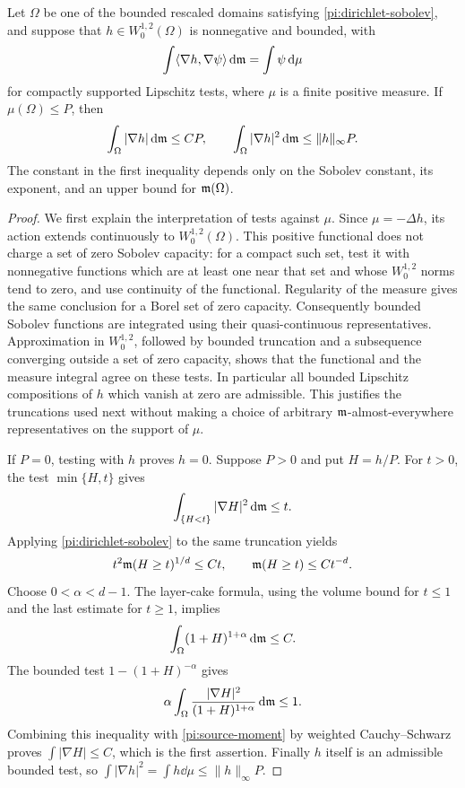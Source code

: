 \begin{lemma}
\label{pi:positive-source}
Let $\Omega$ be one of the bounded rescaled domains satisfying
\eqref{pi:dirichlet-sobolev}, and suppose that $h\in W^{1,2}_0(\Omega)$
is nonnegative and bounded, with
\[
 \int\langle\nabla h,\nabla\psi\rangle\,\mathrm d\mathfrak m
 =\int\psi\,\mathrm d\mu
\]
for compactly supported Lipschitz tests, where $\mu$ is a finite
positive measure.  If $\mu(\Omega)\le P$, then
\begin{equation}
 \int_\Omega|\nabla h|\,\mathrm d\mathfrak m\le CP,
 \qquad
 \int_\Omega|\nabla h|^2\,\mathrm d\mathfrak m\le\|h\|_\infty P.
 \label{pi:positive-source-bounds}
\end{equation}
The constant in the first inequality depends only on the Sobolev
constant, its exponent, and an upper bound for $\mathfrak m(\Omega)$.
\end{lemma}

\begin{proof}
We first explain the interpretation of tests against $\mu$.  Since
$\mu=-\Delta h$, its action extends continuously to
$W^{1,2}_0(\Omega)$.  This positive functional does not charge a set
of zero Sobolev capacity: for a compact such set, test it with
nonnegative functions which are at least one near that set and whose
$W^{1,2}_0$ norms tend to zero, and use continuity of the functional.
Regularity of the measure gives the same conclusion for a Borel set
of zero capacity.  Consequently bounded Sobolev functions are
integrated using their quasi-continuous representatives.  Approximation
in $W^{1,2}_0$, followed by bounded truncation and a subsequence
converging outside a set of zero capacity, shows that the functional
and the measure integral agree on these tests.  In particular all
bounded Lipschitz compositions of $h$ which vanish at zero are
admissible.  This justifies the truncations used next without making
a choice of arbitrary $\mathfrak m$-almost-everywhere representatives on the
support of $\mu$.

If $P=0$, testing with $h$ proves $h=0$.  Suppose $P>0$ and put
$H=h/P$.  For $t>0$, the test $\min\{H,t\}$ gives
\[
 \int_{\{H<t\}}|\nabla H|^2\,\mathrm d\mathfrak m\le t.
\]
Applying \eqref{pi:dirichlet-sobolev} to the same truncation yields
\[
 t^2\mathfrak m(H\ge t)^{1/d}\le Ct,
 \qquad \mathfrak m(H\ge t)\le Ct^{-d}.
\]
Choose $0<\alpha<d-1$.  The layer-cake formula, using the volume
bound for $t\le1$ and the last estimate for $t\ge1$, implies
\begin{equation}
 \int_\Omega(1+H)^{1+\alpha}\,\mathrm d\mathfrak m\le C.
 \label{pi:source-moment}
\end{equation}
The bounded test $1-(1+H)^{-\alpha}$ gives
\[
 \alpha\int_\Omega
 \frac{|\nabla H|^2}{(1+H)^{1+\alpha}}\,\mathrm d\mathfrak m\le1.
\]
Combining this inequality with \eqref{pi:source-moment} by weighted
Cauchy--Schwarz proves $\int|\nabla H|\le C$, which is the first
assertion.  Finally $h$ itself is an admissible bounded test, so
$\int|\nabla h|^2=\int h\dd\mu\le\|h\|_\infty P$.
\end{proof}

